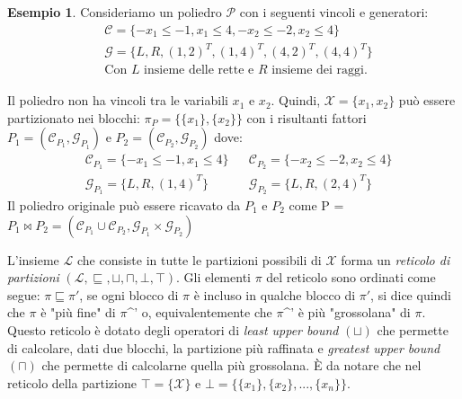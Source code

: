 \documentclass[italian]{mimosis}
\theoremstyle{definition}
\newtheorem{exmp}{Esempio}[section]
\begin{document}
\begin{exmp}
  Consideriamo un poliedro $\mathcal{P}$ con i seguenti vincoli e generatori:
  \begin{align*}
    &\mathcal{C} = \{-x_{1} \le -1, x_{1} \le 4, -x_{2} \le -2, x_{2} \le 4\} \\
    &\mathcal{G} = \{\mathit{L}, \mathit{R}, (1,2)^T, (1,4)^T, (4,2)^T, (4,4)^T\} \\
    &\text{Con } \mathit{L} \text{ insieme delle rette e } \mathit{R} \text{ insieme dei raggi.}
  \end{align*}

  Il poliedro non ha vincoli tra le variabili $x_1$ e $x_2$. Quindi, $\mathcal{X} = \{x_1,x_2\}$
  può essere partizionato nei blocchi: $\pi_P = \{\{x_1\}, \{x_2\}\}$ con i risultanti fattori
  $P_1 = (\mathcal{C}_{P_1}, \mathcal{G}_{P_1})$ e $P_2 = (\mathcal{C}_{P_2}, \mathcal{G}_{P_2})$ dove:
  \begin{align*}
      &\mathcal{C}_{P_{1}} = \{-x_{1} \le -1, x_{1} \le 4\}  &&\mathcal{C}_{P_{2}} = \{ -x_{2} \le -2, x_{2} \le 4\} \\
      &\mathcal{G}_{P_{1}} = \{\mathit{L}, \mathit{R}, (1,4)^T\} &&\mathcal{G}_{P_{2}} = \{\mathit{L}, \mathit{R}, (2,4)^T\}
  \end{align*}
  Il poliedro originale può essere ricavato da $P_{1}$ e $P_{2}$ come
  P = $P_{1} \bowtie P_{2} = (\mathcal{C}_{P_{1}} \cup \mathcal{C}_{P_{2}}, \mathcal{G}_{P_{1}} \times \mathcal{G}_{P_{2}})$
\end{exmp}

L'insieme \(\mathcal{L}\) che consiste in tutte le partizioni possibili di \(\mathcal{X}\)
forma un \emph{reticolo di partizioni} \((\mathcal{L}, \sqsubseteq, \sqcup, \sqcap,
\bot, \top)\). Gli elementi \(\pi\) del reticolo sono ordinati come segue: \(\pi
\sqsubseteq \pi'\), se ogni blocco di \(\pi\) è incluso in qualche blocco di
\(\pi'\), si dice quindi che \(\pi\) è "più fine" di \(\pi\)\^{}' o, equivalentemente che
\(\pi\)\^{}' è più "grossolana" di \(\pi\). Questo reticolo è dotato degli operatori di \emph{least upper bound}
\((\sqcup)\) che permette di calcolare, dati due blocchi, la partizione più
raffinata e \emph{greatest upper bound} \((\sqcap)\) che permette di calcolarne quella
più grossolana. È da notare che nel reticolo della
partizione \(\top = \{\mathcal{X}\}\) e \(\bot = \{\{x_1\}, \{x_2\}, ..., \{x_n\}\}\).
\end{document}
